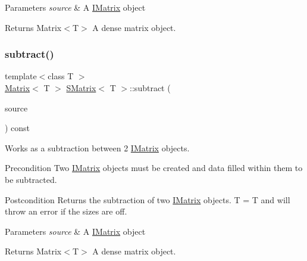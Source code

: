 \begin{DoxyParams}{Parameters}
{\em source} & A \mbox{\hyperlink{class_i_matrix}{I\+Matrix}} object \\
\hline
\end{DoxyParams}
\begin{DoxyReturn}{Returns}
Matrix$<$\+T$>$ A dense matrix object. 
\end{DoxyReturn}
\mbox{\label{class_s_matrix_a0dc67bdaf9cc1a9bb33d16a957831c43}} 
\subsubsection{\texorpdfstring{subtract()}{subtract()}\hspace{0.1cm}{\footnotesize\ttfamily [4/6]}}
{\footnotesize\ttfamily template$<$class T $>$ \\
\mbox{\hyperlink{class_matrix}{Matrix}}$<$ T $>$ \mbox{\hyperlink{class_s_matrix}{S\+Matrix}}$<$ T $>$\+::subtract (\begin{DoxyParamCaption}\item[{const \mbox{\hyperlink{class_i_matrix}{I\+Matrix}}$<$ \mbox{\hyperlink{class_u_matrix}{U\+Matrix}}$<$ T $>$, T $>$ \&}]{source }\end{DoxyParamCaption}) const}



Works as a subtraction between 2 \mbox{\hyperlink{class_i_matrix}{I\+Matrix}} objects. 

\begin{DoxyPrecond}{Precondition}
Two \mbox{\hyperlink{class_i_matrix}{I\+Matrix}} objects must be created and data filled within them to be subtracted. 
\end{DoxyPrecond}
\begin{DoxyPostcond}{Postcondition}
Returns the subtraction of two \mbox{\hyperlink{class_i_matrix}{I\+Matrix}} objects. T = T and will throw an error if the sizes are off.
\end{DoxyPostcond}

\begin{DoxyParams}{Parameters}
{\em source} & A \mbox{\hyperlink{class_i_matrix}{I\+Matrix}} object \\
\hline
\end{DoxyParams}
\begin{DoxyReturn}{Returns}
Matrix$<$\+T$>$ A dense matrix object. 
\end{DoxyReturn}
\mbox{\label{class_s_matrix_ae5950543920513f4ff263055666c1082}} 
